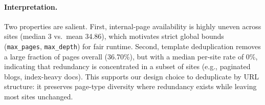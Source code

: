 \paragraph{Interpretation.}
Two properties are salient. First, internal-page availability is highly uneven across sites (median 3 vs.\ mean 34.86), which motivates strict global bounds (\texttt{max\_pages}, \texttt{max\_depth}) for fair runtime. Second, template deduplication removes a large fraction of pages overall (36.70\%), but with a median per-site rate of 0\%, indicating that redundancy is concentrated in a subset of sites (e.g., paginated blogs, index-heavy docs). This supports our design choice to deduplicate by URL structure: it preserves page-type diversity where redundancy exists while leaving most sites unchanged.






